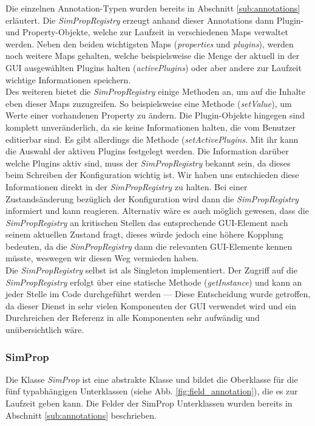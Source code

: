 \documentclass[a4paper, 11pt]{article} %
\begin{document}
Die einzelnen Annotation-Typen wurden bereits in Abschnitt \ref{sub:annotations} erläutert. Die \emph{SimPropRegistry} erzeugt anhand dieser Annotations dann Plugin- und Property-Objekte, welche zur Laufzeit in verschiedenen Maps verwaltet werden. Neben den beiden wichtigsten Maps (\emph{properties} und \emph{plugins}), werden noch weitere Maps gehalten, welche beispielsweise die Menge der aktuell in der GUI ausgewählten Plugins halten (\emph{activePlugins}) oder aber andere zur Laufzeit wichtige Informationen speichern.\\

Des weiteren bietet die \emph{SimPropRegistry} einige Methoden an, um auf die Inhalte eben dieser Maps zuzugreifen. So beispielsweise eine Methode (\emph{setValue}), um Werte einer vorhandenen Property zu ändern. Die Plugin-Objekte hingegen sind komplett unveränderlich, da sie keine Informationen halten, die vom Benutzer editierbar sind. Es gibt allerdings die Methode (\emph{setActivePlugins}. Mit ihr kann die Auswahl der aktiven Plugins festgelegt werden. Die Information darüber welche Plugins aktiv sind, muss der \emph{SimPropRegistry} bekannt sein, da dieses beim Schreiben der Konfiguration wichtig ist. Wir haben uns entschieden diese Informationen direkt in der \emph{SimPropRegistry} zu halten. Bei einer Zustandsänderung bezüglich der Konfiguration wird dann die \emph{SimPropRegistry} informiert und kann reagieren. Alternativ wäre es auch möglich gewesen, dass die \emph{SimPropRegistry} an kritischen Stellen das entsprechende GUI-Element nach seinem aktuellen Zustand fragt, dieses würde jedoch eine höhere Kopplung bedeuten, da die \emph{SimPropRegistry} dann die relevanten GUI-Elemente kennen müsste, weswegen wir diesen Weg vermieden haben.\\

Die \emph{SimPropRegistry} selbst ist als Singleton implementiert. Der Zugriff auf die \emph{SimPropRegistry} erfolgt über eine statische Methode (\emph{getInstance}) und kann an jeder Stelle im Code durchgeführt werden --- Diese Entscheidung wurde getroffen, da dieser Dienst in sehr vielen Komponenten der GUI verwendet wird und ein Durchreichen der Referenz in alle Komponenten sehr aufwändig und unübersichtlich wäre. 

\subsubsection{SimProp} %
\label{ssub:simprop}
Die Klasse \emph{SimProp} ist eine abstrakte Klasse und bildet die Oberklasse für die fünf typabhängigen Unterklassen (siehe Abb. \ref{fig:field_annotation}), die es zur Laufzeit geben kann. Die Felder der SimProp Unterklassen wurden bereits in Abschnitt \ref{sub:annotations} beschrieben. \\
\end{document}
